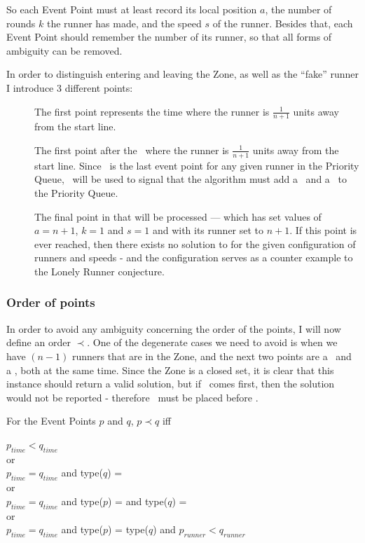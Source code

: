 So each Event Point must at least record its local position $a$, the number of rounds $k$ the runner has made, and the speed $s$ of the runner. Besides that, each Event Point should remember the number of its runner, so that all forms of ambiguity can be removed.

In order to distinguish entering and leaving the Zone, as well as the ``fake'' runner I introduce 3 different points:
\begin{description}
\item[\comStart] The first point represents the time where the runner is $\frac{1}{n + 1}$ units away from the start line.
\item[\comEnd] The first point after the \comStart\, where the runner is $\frac{1}{n + 1}$ units away from the start line. Since \comEnd\, is the last event point for any given runner in the Priority Queue, \comEnd\, will be used to signal that the algorithm must add a \comStart\, and a \comEnd\ to the Priority Queue.
\item[\comFin] The final point in that will be processed --- which has set values of $a = n+1$, $k = 1$ and $s = 1$ and with its runner set to $n+1$. If this point is ever reached, then there exists no solution to  for the given configuration of runners and speeds - and the configuration serves as a counter example to the Lonely Runner conjecture.
\end{description}

\subsubsection{Order of points}
\label{order}
In order to avoid any ambiguity concerning the order of the points, I will now define an order $\prec$. One of the degenerate cases we need to avoid is when we have $(n-1)$ runners that are in the Zone, and the next two points are a \comEnd\, and a \comStart, both at the same time. Since the Zone is a closed set, it is clear that this instance should return a valid solution, but if \comEnd\, comes first, then the solution would not be reported - therefore \comStart\, must be placed before \comEnd.

\begin{defi}
For the Event Points $p$ and $q$, $p \prec q$ iff
\begin{center}
\label{orderOfPoints}
$p_{time} < q_{time}$\\
or \\
$p_{time} = q_{time}$ and type($q$) = \comFin\\
or \\
$p_{time} = q_{time}$ and type($p$) = \comStart and type($q$) = \comEnd \\
or \\
$p_{time} = q_{time}$ and type($p$) = type($q$) and $p_{runner} < q_{runner}$
\end{center}
\end{defi}


